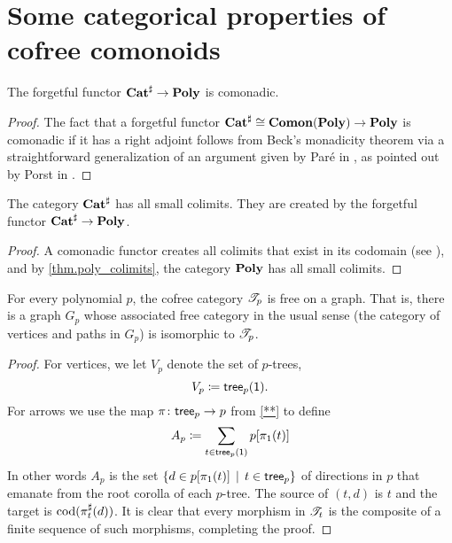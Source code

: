 \documentclass[Book-Poly]{subfiles}
\begin{document}








\section{Some categorical properties of cofree comonoids}

\begin{proposition}[Porst]
The forgetful functor $\mathbf{Cat}^\sharp\to\mathbf{Poly}$ is comonadic.
\end{proposition}
\begin{proof}
The fact that a forgetful functor $\mathbf{Cat}^\sharp\cong\mathbf{Comon}(\mathbf{Poly})\to\mathbf{Poly}$ is comonadic if it has a right adjoint follows from Beck's monadicity theorem via a straightforward generalization of an argument given by Par{\'e} in \cite[pp.~138-9]{pare1969absolute}, as pointed out by Porst in \cite[Fact~3.1]{porst2019colimits}.
\end{proof}

\begin{corollary}
The category $\mathbf{Cat}^\sharp$ has all small colimits.
They are created by the forgetful functor $\mathbf{Cat}^\sharp\to\mathbf{Poly}$.
\end{corollary}
\begin{proof}
A comonadic functor creates all colimits that exist in its codomain (see \cite{nlab:created-limit}), and by \cref{thm.poly_colimits}, the category $\mathbf{Poly}$ has all small colimits.
\end{proof}

\begin{proposition}\label{prop.cofree_free_on_graph}
For every polynomial $p$, the cofree category $\mathscr{T}_{p}$ is free on a graph. That is, there is a graph $G_p$ whose associated free category in the usual sense (the category of vertices and paths in $G_p$) is isomorphic to $\mathscr{T}_{p}$.
\end{proposition}
\begin{proof}
For vertices, we let $V_p$ denote the set of $p$-trees,
\[V_p\coloneqq\mathsf{tree}_p(\textsf{1}).\]
For arrows we use the map $\pi\colon\mathsf{tree}_p\to p$ from \cref{**} to define
\[
A_p\coloneqq\sum_{t\in\mathsf{tree}_p(\textsf{1})}p[\pi_1(t)]
\]
In other words $A_p$ is the set $\{d\in p[\pi_1(t)]\,\mid\,t\in\mathsf{tree}_p\}$ of directions in $p$ that emanate from the root corolla of each $p$-tree. The source of $(t,d)$ is $t$ and the target is $\operatorname{cod}(\pi^\sharp_t(d))$. It is clear that every morphism in $\mathscr{T}_{t}$ is the composite of a finite sequence of such morphisms, completing the proof.
\end{proof}
\end{document}
